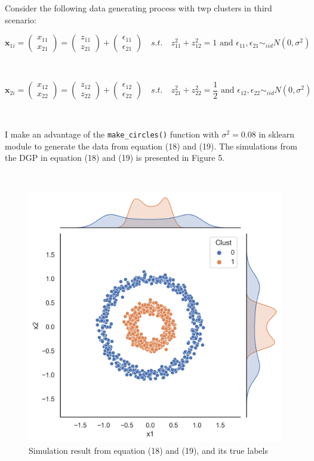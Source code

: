 \documentclass[a4paper]{article}
\begin{document}
Consider the following data generating process with twp clusters in third scenario:

\begin{equation}
	\boldsymbol{x}_{1i} = 
	\begin{pmatrix}
		x_{11} \\
		x_{21}
	\end{pmatrix}  = 
	\begin{pmatrix}
		z_{11} \\
		z_{21}
	\end{pmatrix} + 
	\begin{pmatrix}
		\epsilon_{11} \\
		\epsilon_{21}
	\end{pmatrix}
	 \quad s.t. \quad 
	z_{11}^2 + z_{12}^2 = 1 \mbox{  and  }
	\epsilon_{11}, \epsilon_{21} \sim_{iid} N(0, \sigma^2)
\end{equation}

\

\begin{equation} 
	\boldsymbol{x}_{2i} = 
	\begin{pmatrix}
		x_{12} \\
		x_{22}
	\end{pmatrix}  = 
	\begin{pmatrix}
		z_{12} \\
		z_{22}
	\end{pmatrix} + 
	\begin{pmatrix}
		\epsilon_{12} \\
		\epsilon_{22}
	\end{pmatrix}
	 \quad s.t. \quad 
	z_{21}^2 + z_{22}^2 = \frac{1}{2} \mbox{  and  }
	\epsilon_{12}, \epsilon_{22} \sim_{iid} N(0, \sigma^2)
\end{equation}

\

I make an advantage of the \texttt{make\_circles()} function with $\sigma^2 = 0.08$ in sklearn module to generate the data from equation (18) and (19). The simulations from the DGP in equation (18) and (19) is presented in Figure 5.

\

\begin{figure}[h!]
  \centering
  \includegraphics[width=0.45\linewidth]{../Simu_results/sen3.png}
  \caption{Simulation result from equation (18) and (19), and its true labels}
\end{figure}
\end{document}
